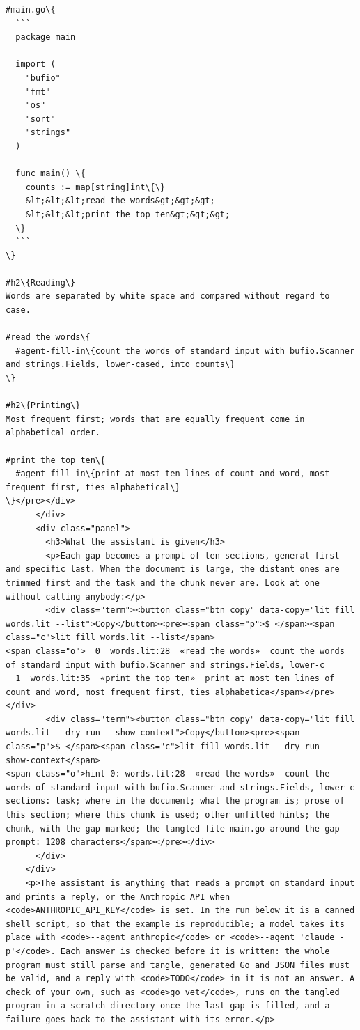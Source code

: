 \documentclass[10pt,a4paper]{article}
\newcounter{chunk}
\begin{document}
\begin{Verbatim}
#main.go\{
  ```
  package main

  import (
  	"bufio"
  	"fmt"
  	"os"
  	"sort"
  	"strings"
  )

  func main() \{
  	counts := map[string]int\{\}
  	&lt;&lt;&lt;read the words&gt;&gt;&gt;
  	&lt;&lt;&lt;print the top ten&gt;&gt;&gt;
  \}
  ```
\}

#h2\{Reading\}
Words are separated by white space and compared without regard to case.

#read the words\{
  #agent-fill-in\{count the words of standard input with bufio.Scanner and strings.Fields, lower-cased, into counts\}
\}

#h2\{Printing\}
Most frequent first; words that are equally frequent come in alphabetical order.

#print the top ten\{
  #agent-fill-in\{print at most ten lines of count and word, most frequent first, ties alphabetical\}
\}</pre></div>
      </div>
      <div class="panel">
        <h3>What the assistant is given</h3>
        <p>Each gap becomes a prompt of ten sections, general first and specific last. When the document is large, the distant ones are trimmed first and the task and the chunk never are. Look at one without calling anybody:</p>
        <div class="term"><button class="btn copy" data-copy="lit fill words.lit --list">Copy</button><pre><span class="p">$ </span><span class="c">lit fill words.lit --list</span>
<span class="o">  0  words.lit:28  «read the words»  count the words of standard input with bufio.Scanner and strings.Fields, lower-c
  1  words.lit:35  «print the top ten»  print at most ten lines of count and word, most frequent first, ties alphabetica</span></pre></div>
        <div class="term"><button class="btn copy" data-copy="lit fill words.lit --dry-run --show-context">Copy</button><pre><span class="p">$ </span><span class="c">lit fill words.lit --dry-run --show-context</span>
<span class="o">hint 0: words.lit:28  «read the words»  count the words of standard input with bufio.Scanner and strings.Fields, lower-c
sections: task; where in the document; what the program is; prose of this section; where this chunk is used; other unfilled hints; the chunk, with the gap marked; the tangled file main.go around the gap
prompt: 1208 characters</span></pre></div>
      </div>
    </div>
    <p>The assistant is anything that reads a prompt on standard input and prints a reply, or the Anthropic API when <code>ANTHROPIC_API_KEY</code> is set. In the run below it is a canned shell script, so that the example is reproducible; a model takes its place with <code>--agent anthropic</code> or <code>--agent 'claude -p'</code>. Each answer is checked before it is written: the whole program must still parse and tangle, generated Go and JSON files must be valid, and a reply with <code>TODO</code> in it is not an answer. A check of your own, such as <code>go vet</code>, runs on the tangled program in a scratch directory once the last gap is filled, and a failure goes back to the assistant with its error.</p>

\end{Verbatim}
\end{document}
